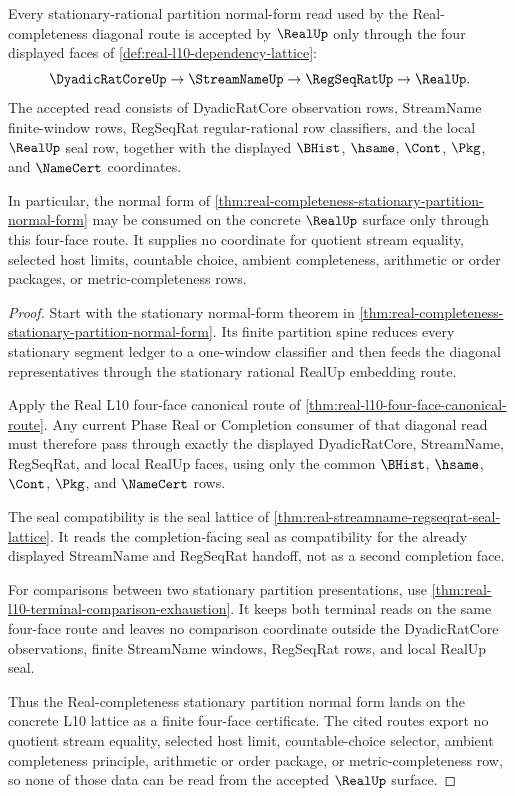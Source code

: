\begin{theorem}
\label{thm:realup-stationary-partition-normal-form-boundary}
Every stationary-rational partition normal-form read used by the Real-completeness diagonal route is accepted by $\RealUp$ only through the four displayed faces of \autoref{def:real-l10-dependency-lattice}:
$$
\DyadicRatCoreUp \to \StreamNameUp \to \RegSeqRatUp \to \RealUp.
$$
The accepted read consists of DyadicRatCore observation rows, StreamName finite-window rows, RegSeqRat regular-rational row classifiers, and the local $\RealUp$ seal row, together with the displayed $\BHist$, $\hsame$, $\Cont$, $\Pkg$, and $\NameCert$ coordinates.

In particular, the normal form of \autoref{thm:real-completeness-stationary-partition-normal-form} may be consumed on the concrete $\RealUp$ surface only through this four-face route. It supplies no coordinate for quotient stream equality, selected host limits, countable choice, ambient completeness, arithmetic or order packages, or metric-completeness rows.
\end{theorem}
\begin{proof}
Start with the stationary normal-form theorem in \autoref{thm:real-completeness-stationary-partition-normal-form}. Its finite partition spine reduces every stationary segment ledger to a one-window classifier and then feeds the diagonal representatives through the stationary rational RealUp embedding route.

Apply the Real L10 four-face canonical route of \autoref{thm:real-l10-four-face-canonical-route}. Any current Phase Real or Completion consumer of that diagonal read must therefore pass through exactly the displayed DyadicRatCore, StreamName, RegSeqRat, and local RealUp faces, using only the common $\BHist$, $\hsame$, $\Cont$, $\Pkg$, and $\NameCert$ rows.

The seal compatibility is the seal lattice of \autoref{thm:real-streamname-regseqrat-seal-lattice}. It reads the completion-facing seal as compatibility for the already displayed StreamName and RegSeqRat handoff, not as a second completion face.

For comparisons between two stationary partition presentations, use \autoref{thm:real-l10-terminal-comparison-exhaustion}. It keeps both terminal reads on the same four-face route and leaves no comparison coordinate outside the DyadicRatCore observations, finite StreamName windows, RegSeqRat rows, and local RealUp seal.

Thus the Real-completeness stationary partition normal form lands on the concrete L10 lattice as a finite four-face certificate. The cited routes export no quotient stream equality, selected host limit, countable-choice selector, ambient completeness principle, arithmetic or order package, or metric-completeness row, so none of those data can be read from the accepted $\RealUp$ surface.
\end{proof}

